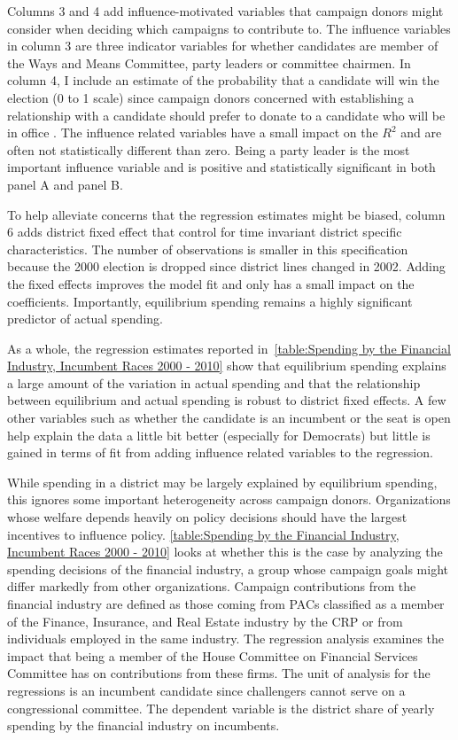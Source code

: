 \documentclass[12pt,final,fleqn]{article}
\theoremstyle{plain}
\begin{document}
Columns 3 and 4 add influence-motivated variables that campaign donors might consider when deciding which campaigns to contribute to. The influence variables in column 3 are three indicator variables for whether candidates are member of the Ways and Means Committee, party leaders or committee chairmen. In column 4, I include an estimate of the probability that a candidate will win the election (0 to 1 scale) since campaign donors concerned with establishing a relationship with a candidate should prefer to donate to a candidate who will be in office \citep[see for instance][]{snyder1990campaign}. The influence related variables have a small impact on the $R^2$ and are often not statistically different than zero. Being a party leader is the most important influence variable and is positive and statistically significant in both panel A and panel B. 

To help alleviate concerns that the regression estimates might be biased, column 6 adds district fixed effect that control for time invariant district specific characteristics. The number of observations is smaller in this specification because the 2000 election is dropped since district lines changed in 2002. Adding the fixed effects improves the model fit and only has a small impact on the coefficients. Importantly, equilibrium spending remains a highly significant predictor of actual spending.

As a whole, the regression estimates reported in~\autoref{table:Spending by the Financial Industry, Incumbent Races 2000 - 2010} show that equilibrium spending explains a large amount of the variation in actual spending and that the relationship between equilibrium and actual spending is robust to district fixed effects. A few other variables such as whether the candidate is an incumbent or the seat is open help explain the data a little bit better (especially for Democrats) but little is gained in terms of fit from adding influence related variables to the regression.

While spending in a district may be largely explained by equilibrium spending, this ignores some important heterogeneity across campaign donors. Organizations whose welfare depends heavily on policy decisions should have the largest incentives to influence policy. \autoref{table:Spending by the Financial Industry, Incumbent Races 2000 - 2010} looks at whether this is the case by analyzing the spending decisions of the financial industry, a group whose campaign goals might differ markedly from other organizations. Campaign contributions from the financial industry are defined as those coming from PACs classified as a member of the Finance, Insurance, and Real Estate industry by the CRP or from individuals employed in the same industry. The regression analysis examines the impact that being a member of the House Committee on Financial Services Committee has on contributions from these firms. The unit of analysis for the regressions is an incumbent candidate since challengers cannot serve on a congressional committee. The dependent variable is the district share of yearly spending by the financial industry on incumbents. 
\end{document}

